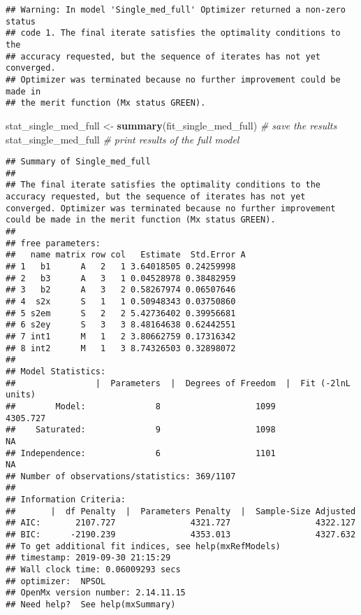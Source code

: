 \documentclass[11pt,]{article}
\newenvironment{Shaded}{\begin{snugshade}}{\end{snugshade}}
\newcommand{\CommentTok}[1]{\textcolor[rgb]{0.56,0.35,0.01}{\textit{#1}}}
\newcommand{\KeywordTok}[1]{\textcolor[rgb]{0.13,0.29,0.53}{\textbf{#1}}}
\newcommand{\NormalTok}[1]{#1}
\newcommand{\StringTok}[1]{\textcolor[rgb]{0.31,0.60,0.02}{#1}}
\begin{document}
\begin{verbatim}
## Warning: In model 'Single_med_full' Optimizer returned a non-zero status
## code 1. The final iterate satisfies the optimality conditions to the
## accuracy requested, but the sequence of iterates has not yet converged.
## Optimizer was terminated because no further improvement could be made in
## the merit function (Mx status GREEN).
\end{verbatim}

\begin{Shaded}
\begin{Highlighting}[]
\NormalTok{stat_single_med_full <-}\StringTok{ }\KeywordTok{summary}\NormalTok{(fit_single_med_full) }\CommentTok{# save the results}
\NormalTok{stat_single_med_full }\CommentTok{# print results of the full model}
\end{Highlighting}
\end{Shaded}

\begin{verbatim}
## Summary of Single_med_full 
##  
## The final iterate satisfies the optimality conditions to the accuracy requested, but the sequence of iterates has not yet converged. Optimizer was terminated because no further improvement could be made in the merit function (Mx status GREEN). 
##  
## free parameters:
##   name matrix row col   Estimate  Std.Error A
## 1   b1      A   2   1 3.64018505 0.24259998  
## 2   b3      A   3   1 0.04528978 0.38482959  
## 3   b2      A   3   2 0.58267974 0.06507646  
## 4  s2x      S   1   1 0.50948343 0.03750860  
## 5 s2em      S   2   2 5.42736402 0.39956681  
## 6 s2ey      S   3   3 8.48164638 0.62442551  
## 7 int1      M   1   2 3.80662759 0.17316342  
## 8 int2      M   1   3 8.74326503 0.32898072  
## 
## Model Statistics: 
##                |  Parameters  |  Degrees of Freedom  |  Fit (-2lnL units)
##        Model:              8                   1099              4305.727
##    Saturated:              9                   1098                    NA
## Independence:              6                   1101                    NA
## Number of observations/statistics: 369/1107
## 
## Information Criteria: 
##       |  df Penalty  |  Parameters Penalty  |  Sample-Size Adjusted
## AIC:       2107.727               4321.727                 4322.127
## BIC:      -2190.239               4353.013                 4327.632
## To get additional fit indices, see help(mxRefModels)
## timestamp: 2019-09-30 21:15:29 
## Wall clock time: 0.06009293 secs 
## optimizer:  NPSOL 
## OpenMx version number: 2.14.11.15 
## Need help?  See help(mxSummary)
\end{verbatim}
\end{document}
